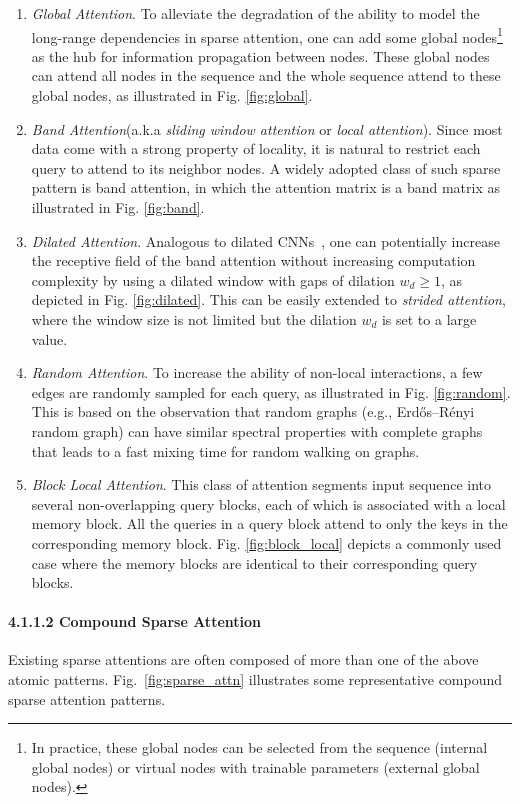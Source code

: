 \documentclass[manuscript,acmsmall,screen,nonacm]{acmart}
\theoremstyle{definition}
\begin{document}
\begin{enumerate}
  \item \textit{Global Attention}. To alleviate the degradation of the ability to model the long-range dependencies in sparse attention, one can add some global nodes\footnote{In practice, these global nodes can be selected from the sequence (internal global nodes) or virtual nodes with trainable parameters (external global nodes).} as the hub for information propagation between nodes. These global nodes can attend all nodes in the sequence and the whole sequence attend to these global nodes, as illustrated in Fig. \ref{fig:global}.
  \item \textit{Band Attention}(a.k.a \textit{sliding window attention} or \textit{local attention}). Since most data come with a strong property of locality, it is natural to restrict each query to attend to its neighbor nodes. A widely adopted class of such sparse pattern is band attention, in which the attention matrix is a band matrix as illustrated in Fig. \ref{fig:band}.
  \item \textit{Dilated Attention}. Analogous to dilated CNNs~\cite{oord16dilatedcnn}, one can potentially increase the receptive field of the band attention without increasing computation complexity by using a dilated window with gaps of dilation $w_d\ge 1$, as depicted in Fig. \ref{fig:dilated}. This can be easily extended to \textit{strided attention}, where the window size is not limited but the dilation $w_d$ is set to a large value.
  \item \textit{Random Attention}. To increase the ability of non-local interactions, a few edges are randomly sampled for each query, as illustrated in Fig. \ref{fig:random}. This is based on the observation that random graphs (e.g., Erd\H os–R\'enyi random graph) can have similar spectral properties with complete graphs that leads to a fast mixing time for random walking on graphs.
  \item \textit{Block Local Attention}. This class of attention segments input sequence into several non-overlapping query blocks, each of which is associated with a local memory block. All the queries in a query block attend to only the keys in the corresponding memory block. Fig. \ref{fig:block_local} depicts a commonly used case where the memory blocks are identical to their corresponding query blocks.
\end{enumerate}

\paragraph{4.1.1.2  Compound Sparse Attention}
Existing sparse attentions are often composed of more than one of the above atomic patterns. Fig.~\ref{fig:sparse_attn} illustrates some representative compound sparse attention patterns.
\end{document}
